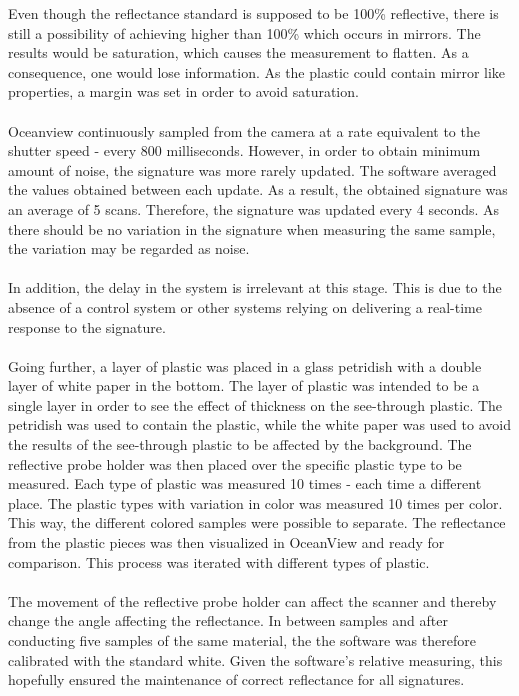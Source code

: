 Even though the reflectance standard is supposed to be 100\% reflective, there is still a possibility of achieving higher than 100\% which occurs in mirrors. The results would be saturation, which causes the measurement to flatten. As a consequence, one would lose information. As the plastic could contain mirror like properties, a margin was set in order to avoid saturation.
\\\\
Oceanview continuously sampled from the camera at a rate equivalent to the shutter speed - every 800 milliseconds. However, in order to obtain minimum amount of noise, the signature was more rarely updated. The software averaged the values obtained between each update. As a result, the obtained signature was an average of 5 scans. Therefore, the signature was updated every 4 seconds. As there should be no variation in the signature when measuring the same sample, the variation may be regarded as noise. 
\\\\
In addition, the delay in the system is irrelevant at this stage. This is due to the absence of a control system or other systems relying on delivering a real-time response to the signature.
\\\\
Going further, a layer of plastic was placed in a glass petridish with a double layer of white paper in the bottom. The layer of plastic was intended to be a single layer in order to see the effect of thickness on the see-through plastic. The petridish was used to contain the plastic, while the white paper was used to avoid the results of the see-through plastic to be affected by the background. The reflective probe holder was then placed over the specific plastic type to be measured. Each type of plastic was measured 10 times - each time a different place. The plastic types with variation in color was measured 10 times per color. This way, the different colored samples were possible to separate. The reflectance from the plastic pieces was then visualized in OceanView and ready for comparison. This process was iterated with different types of plastic. 
\\\\
The movement of the reflective probe holder can affect the scanner and thereby change the angle affecting the reflectance. In between samples and after conducting five samples of the same material, the the software was therefore calibrated with the standard white. Given the software’s relative measuring, this hopefully ensured the maintenance of correct reflectance for all signatures.

